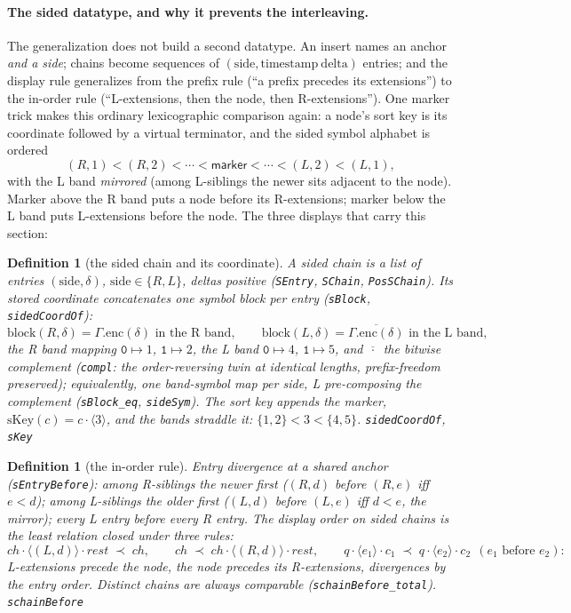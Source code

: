 \documentclass[11pt]{article}
\newtheorem{definition}[theorem]{Definition}
\newcommand{\lean}[1]{\texttt{#1}}
\newcommand{\code}[1]{\texttt{#1}}
\begin{document}
\paragraph{The sided datatype, and why it prevents the interleaving.}
The generalization does not build a second datatype. An insert names an
anchor \emph{and a side}; chains become sequences of
$(\mathrm{side}, \mathrm{timestamp\ delta})$ entries; and the display
rule generalizes from the prefix rule (``a prefix precedes its
extensions'') to the in-order rule (``L-extensions, then the node, then
R-extensions''). One marker trick makes this ordinary lexicographic
comparison again: a node's sort key is its coordinate followed by a
virtual terminator, and the sided symbol alphabet is ordered
\[
  (R,1) < (R,2) < \cdots < \mathsf{marker} < \cdots < (L,2) < (L,1),
\]
with the L band \emph{mirrored} (among L-siblings the newer sits
adjacent to the node). Marker above the R band puts a node before its
R-extensions; marker below the L band puts L-extensions before the
node. The three displays that carry this section:

\begin{definition}[the sided chain and its coordinate]
\label{def:schain}
A sided chain is a list of entries $(\mathrm{side}, \delta)$,
$\mathrm{side} \in \{R, L\}$, deltas positive (\lean{SEntry},
\lean{SChain}, \lean{PosSChain}). Its stored coordinate concatenates
one symbol block per entry (\lean{sBlock}, \lean{sidedCoordOf}):
\[
  \mathrm{block}(R, \delta) = \Gamma.\mathrm{enc}(\delta)
  \text{ in the R band},
  \qquad
  \mathrm{block}(L, \delta) =
  \overline{\Gamma.\mathrm{enc}(\delta)}
  \text{ in the L band},
\]
the R band mapping $\code{0} \mapsto 1$, $\code{1} \mapsto 2$, the L
band $\code{0} \mapsto 4$, $\code{1} \mapsto 5$, and
$\overline{\,\cdot\,}$ the bitwise complement (\lean{compl}: the
order-reversing twin at identical lengths, prefix-freedom
preserved); equivalently, one band-symbol map per side, L
pre-composing the complement (\lean{sBlock\_eq}, \lean{sideSym}).
The sort key appends the marker, $\mathrm{sKey}(c) = c \cdot
\langle 3 \rangle$, and the bands straddle it: $\{1,2\} < 3 <
\{4,5\}$.
\hfill\lean{sidedCoordOf}, \lean{sKey}
\end{definition}

\begin{definition}[the in-order rule]
\label{def:schainbefore}
Entry divergence at a shared anchor (\lean{sEntryBefore}): among
R-siblings the newer first ($(R,d)$ before $(R,e)$ iff $e < d$);
among L-siblings the older first ($(L,d)$ before $(L,e)$ iff
$d < e$, the mirror); every L entry before every R entry. The
display order on sided chains is the least relation closed under
three rules:
\[
  ch \cdot \langle (L,d) \rangle \cdot rest \;\prec\; ch,
  \qquad
  ch \;\prec\; ch \cdot \langle (R,d) \rangle \cdot rest,
  \qquad
  q \cdot \langle e_1 \rangle \cdot c_1 \;\prec\;
  q \cdot \langle e_2 \rangle \cdot c_2
  \ \ (e_1 \text{ before } e_2) :
\]
L-extensions precede the node, the node precedes its R-extensions,
divergences by the entry order. Distinct chains are always
comparable (\lean{schainBefore\_total}).
\hfill\lean{schainBefore}
\end{definition}
\end{document}
